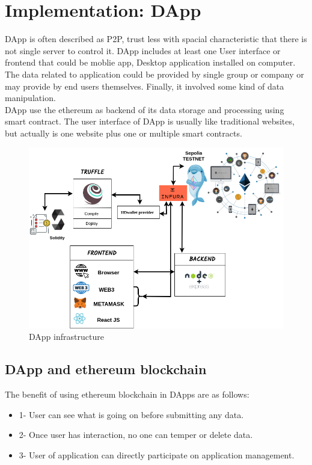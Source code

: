 \chapter{Implementation: DApp}
DApp is often described as P2P, trust less with spacial characteristic that there is not single server to control it. DApp includes at least one User interface or frontend that could be moblie app, Desktop application installed on computer.\\
The data related to application could be provided by single group or company or may provide by end users themselves. Finally, it involved some kind of data manipulation. \\
DApp use the ethereum as backend of its data storage and processing using smart contract. The user interface of DApp is usually like traditional websites, but actually is one website plus one or multiple smart contracts.

\begin{center}
	
	\begin{figure}[htb!]
		
		\begin{minipage}{0.5\linewidth}
			
			\includegraphics[width=1.45\textwidth]{images/chap03_dapp.png}
		\end{minipage}
		\caption{DApp infrastructure}
		
	\end{figure}
	
\end{center}

\section{DApp and ethereum blockchain}
The benefit of using ethereum blockchain in DApps are as follows:\\
 \begin{itemize}
     \item 1- User can see what is going on before submitting any data.
     \item 2- Once user has interaction, no one can temper or delete data.
     \item 3- User of application can directly participate on application management.
 \end{itemize}


